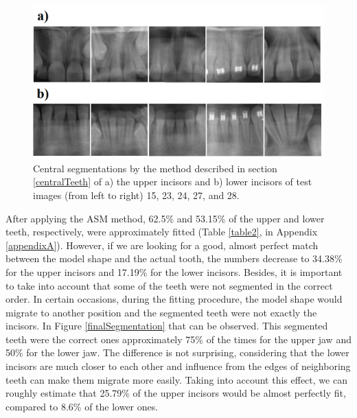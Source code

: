 \documentclass[a4paper,11pt,twoside]{article}
\begin{document}
\begin{figure}
\centering
\includegraphics[width=0.95\columnwidth]{centralExamples.png}
\caption{Central segmentations by the method described in section \textsection\ref{centralTeeth} of a) the upper incisors and b) lower incisors of test images (from left to right) 15, 23, 24, 27, and 28.}
\label{centralExamples}
\end{figure}

After applying the ASM method, 62.5\% and 53.15\% of the upper and lower teeth, respectively, were approximately fitted (Table \ref{table2}, in Appendix \ref{appendixA}). However, if we are looking for a good, almost perfect match between the model shape and the actual tooth, the numbers decrease to 34.38\% for the upper incisors and 17.19\% for the lower incisors. Besides, it is important to take into account that some of the teeth were not segmented in the correct order. In certain occasions, during the fitting procedure, the model shape would migrate to another position and the segmented teeth were not exactly the incisors. In Figure \ref{finalSegmentation} that can be observed. This segmented teeth were the correct ones approximately 75\% of the times for the upper jaw and 50\% for the lower jaw. The difference is not surprising, considering that the lower incisors are much closer to each other and influence from the edges of neighboring teeth can make them migrate more easily. Taking into account this effect, we can roughly estimate that 25.79\% of the upper incisors would be almost perfectly fit, compared to 8.6\% of the lower ones.
\end{document}
